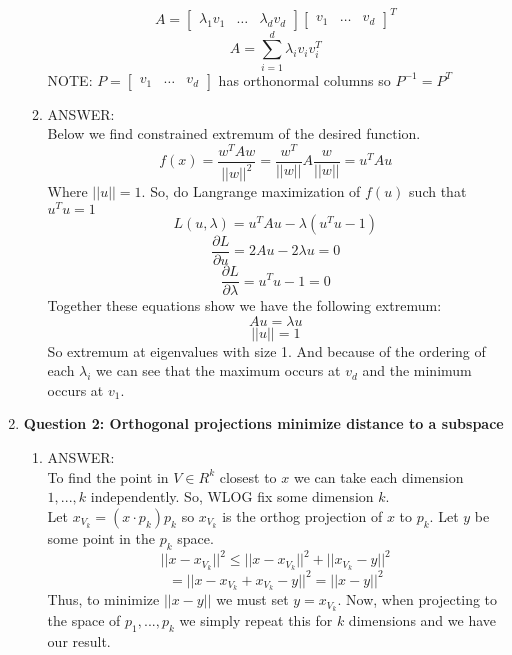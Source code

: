 \documentclass[a4paper, 12pt]{article}
\begin{document}
\begin{enumerate}
\begin{enumerate}
	$$ A = \left [\begin{array}{ccc} \lambda_1 v_1 & \dots & \lambda_d v_d \end{array}\right] \left [\begin{array}{ccc} v_1 & \dots & v_d \end{array}\right]^T$$
	$$ A = \sum_{i=1}^d \lambda_i v_i v_i^T$$
	NOTE: $P = \left [\begin{array}{ccc} v_1 & \dots & v_d \end{array}\right]$ has orthonormal columns so $P^{-1} = P^T$


	\item ANSWER:
	\\ Below we find constrained extremum of the desired function.
	$$ f(x) = \frac{w^TAw}{||w||^2} = \frac{w^T}{||w||}  A  \frac{w}{||w||} = u^TAu$$
	Where $||u|| = 1$. So, do Langrange maximization of $f(u)$ such that $u^Tu = 1$
	$$ L(u, \lambda) = u^TAu - \lambda(u^Tu - 1)$$
	$$\frac{\partial L}{\partial u} = 2Au - 2\lambda u = 0$$	
	$$\frac{\partial L}{\partial \lambda} = u^Tu - 1 = 0$$	
	Together these equations show we have the following extremum:
	$$Au = \lambda u $$ 
	$$ ||u|| = 1$$
	So extremum at eigenvalues with size 1. And because of the ordering of each $\lambda_i$ we can see that the maximum occurs at $v_d$ and the minimum occurs at $v_1$.
	\end{enumerate}



\item \textbf{Question 2: Orthogonal projections minimize distance to a subspace}

	\begin{enumerate}
	\item ANSWER:
	\\
	To find the point in $V \in R^k$  closest to $x$ we can take each dimension $1, ... ,k$ independently. So, WLOG fix some dimension $k$.  
	\\ Let $x_{V_{k}} = (x \cdot p_k)p_k$ so  $x_{V_{k}}$ is the orthog projection of $x$ to $p_k$. Let $y$ be some point in the $p_k$ space.
	$$ || x - x_{V_{k}} ||^2 \le || x - x_{V_{k}} ||^2  +  || x_{V_{k}} - y ||^2$$
	$$ = || x - x_{V_{k}} + x_{V_{k}} - y ||^2 = || x - y ||^2 $$
	Thus, to minimize $||x-y||$ we must set $y =  x_{V_{k}}$. Now, when projecting to the space of $p_1, ... , p_k$ we simply repeat this for $k$ dimensions and we have our result.
	\\


\end{enumerate}
\end{enumerate}
\end{document}
